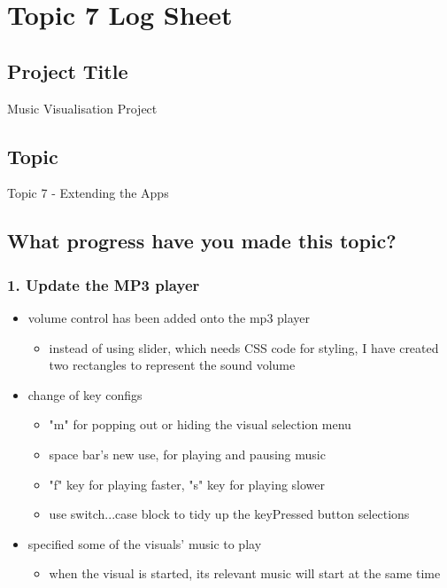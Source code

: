 \chapter*{Topic 7 Log Sheet}

\section*{Project Title}

Music Visualisation Project

\section*{Topic}

Topic 7 - Extending the Apps

\section*{What progress have you made this topic?}

\subsection*{1. Update the MP3 player}

  \begin{itemize}
    \item volume control has been added onto the mp3 player
    \begin{itemize}
      \item instead of using slider, which needs CSS code for styling, I have created two rectangles to represent the sound volume
    \end{itemize}
    \item change of key configs
    \begin{itemize}
      \item "m" for popping out or hiding the visual selection menu
      \item space bar's new use, for playing and pausing music
      \item "f" key for playing faster, "s" key for playing slower
      \item use switch...case block to tidy up the keyPressed button selections
    \end{itemize}
    \item specified some of the visuals' music to play
    \begin{itemize}
      \item when the visual is started, its relevant music will start at the same time
    \end{itemize}
  \end{itemize}

